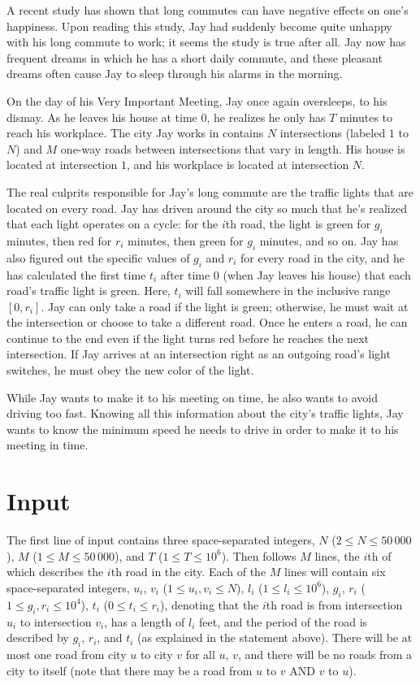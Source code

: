 
A recent study has shown that long commutes can have negative effects on one's happiness. Upon reading
this study, Jay had suddenly become quite unhappy with his long commute to work; it seems the study is
true after all. Jay now has frequent dreams in which he has a short daily commute, and these pleasant
dreams often cause Jay to sleep through his alarms in the morning.

On the day of his Very Important Meeting, Jay once again oversleeps, to his dismay. As he leaves his house
at time $0$, he realizes he only has $T$ minutes to reach his workplace. The city Jay works in contains
$N$ intersections (labeled $1$ to $N$) and $M$ one-way roads between intersections that vary in length.
His house is located at intersection $1$, and his workplace is located at intersection $N$.

The real culprits responsible for Jay's long commute are the traffic lights that are located on every road.
Jay has driven around the city so much that he's realized that each light operates on a cycle: for the $i$th
road, the light is green for $g_i$ minutes, then red for $r_i$ minutes, then green for $g_i$ minutes, and so 
on. Jay has also figured out the specific values of $g_i$ and $r_i$ for every road in the city, and he has
calculated the first time $t_i$ after time $0$ (when Jay leaves his house) that each road's traffic light is
green. Here, $t_i$ will fall somewhere in the inclusive range $[0, r_i]$. Jay can only take a road if the
light is green; otherwise, he must wait at the intersection or choose to take a different road. Once he
enters a road, he can continue to the end even if the light turns red before he reaches the next
intersection. If Jay arrives at an intersection right as an outgoing road's light switches, he must
obey the new color of the light.

While Jay wants to make it to his meeting on time, he also wants to avoid driving too fast. Knowing all
this information about the city's traffic lights, Jay wants to know the minimum speed he needs to drive
in order to make it to his meeting in time.

\section*{Input}

The first line of input contains three space-separated integers, $N$ ($2 \leq N \leq 50\,000$), $M$
($1 \leq M \leq 50\,000$), and $T$ ($1 \leq T \leq 10^6$). Then follows $M$ lines, the $i$th of which
describes the $i$th road in the city. Each of the $M$ lines will contain six space-separated integers,
$u_i$, $v_i$ ($1 \leq u_i, v_i \leq N$), $l_i$ ($1 \leq l_i \leq 10^6$), $g_i$, $r_i$
($1 \leq g_i, r_i \leq 10^4$), $t_i$ ($0 \leq t_i \leq r_i$), denoting that the $i$th road is from
intersection $u_i$ to intersection $v_i$, has a length of $l_i$ feet, and the period of the road is
described by $g_i$, $r_i$, and $t_i$ (as explained in the statement above). There will be at most one road
from city $u$ to city $v$ for all $u$, $v$, and there will be no roads from a city to itself (note that
there may be a road from $u$ to $v$ AND $v$ to $u$).

